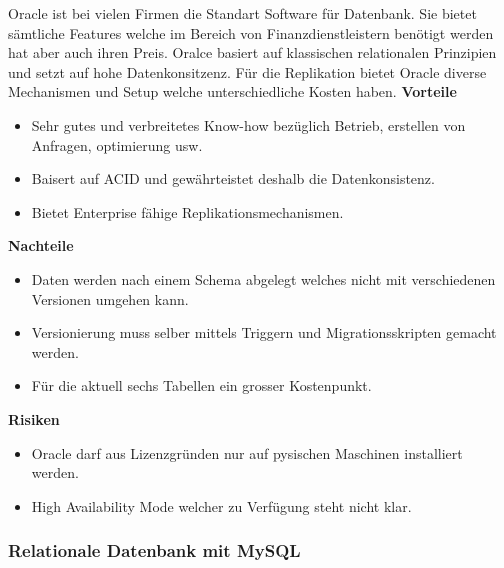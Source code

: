 Oracle ist bei vielen Firmen die Standart Software für Datenbank. Sie bietet sämtliche Features welche im Bereich von Finanzdienstleistern benötigt werden hat aber auch ihren Preis. Oralce basiert auf klassischen relationalen Prinzipien und setzt auf hohe Datenkonsitzenz. Für die Replikation bietet Oracle diverse Mechanismen und Setup welche unterschiedliche Kosten haben.
\newline
\newline
\textbf{Vorteile}
\begin{itemize}
	\item Sehr gutes und verbreitetes Know-how bezüglich Betrieb, erstellen von Anfragen, optimierung usw.
	\item Baisert auf \Gls{ACID} und gewährteistet deshalb die Datenkonsistenz.
	\item Bietet Enterprise fähige Replikationsmechanismen.
\end{itemize}
\textbf{Nachteile}
\begin{itemize}
	\item Daten werden nach einem Schema abgelegt welches nicht mit verschiedenen Versionen umgehen kann.
	\item Versionierung muss selber mittels Triggern und Migrationsskripten gemacht werden.	
	\item Für die aktuell sechs Tabellen ein grosser Kostenpunkt. 
\end{itemize}
\textbf{Risiken}
\begin{itemize}
	\item Oracle darf aus Lizenzgründen nur auf pysischen Maschinen installiert werden.
	\item High Availability Mode welcher zu Verfügung steht nicht klar.
\end{itemize}

\subsubsection{Relationale Datenbank mit MySQL}

